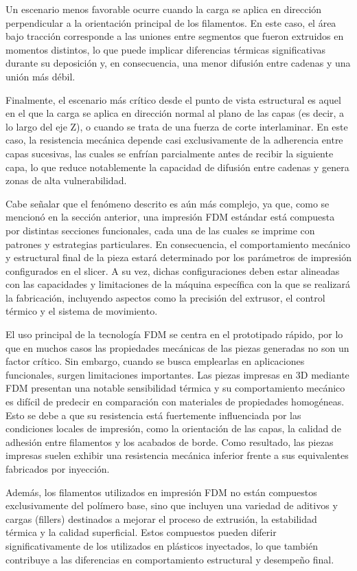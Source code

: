 Un escenario menos favorable ocurre cuando la carga se aplica en dirección perpendicular a la orientación principal de los filamentos. En este caso, el área bajo tracción corresponde a las uniones entre segmentos que fueron extruidos en momentos distintos, lo que puede implicar diferencias térmicas significativas durante su deposición y, en consecuencia, una menor difusión entre cadenas y una unión más débil.

Finalmente, el escenario más crítico desde el punto de vista estructural es aquel en el que la carga se aplica en dirección normal al plano de las capas (es decir, a lo largo del eje Z), o cuando se trata de una fuerza de corte interlaminar. En este caso, la resistencia mecánica depende casi exclusivamente de la adherencia entre capas sucesivas, las cuales se enfrían parcialmente antes de recibir la siguiente capa, lo que reduce notablemente la capacidad de difusión entre cadenas y genera zonas de alta vulnerabilidad.

Cabe señalar que el fenómeno descrito es aún más complejo, ya que, como se mencionó en la sección anterior, una impresión FDM estándar está compuesta por distintas secciones funcionales, cada una de las cuales se imprime con patrones y estrategias particulares. En consecuencia, el comportamiento mecánico y estructural final de la pieza estará determinado por los parámetros de impresión configurados en el slicer. A su vez, dichas configuraciones deben estar alineadas con las capacidades y limitaciones de la máquina específica con la que se realizará la fabricación, incluyendo aspectos como la precisión del extrusor, el control térmico y el sistema de movimiento.

El uso principal de la tecnología FDM se centra en el prototipado rápido, por lo que en muchos casos las propiedades mecánicas de las piezas generadas no son un factor crítico. Sin embargo, cuando se busca emplearlas en aplicaciones funcionales, surgen limitaciones importantes. Las piezas impresas en 3D mediante FDM presentan una notable sensibilidad térmica y su comportamiento mecánico es difícil de predecir en comparación con materiales de propiedades homogéneas. Esto se debe a que su resistencia está fuertemente influenciada por las condiciones locales de impresión, como la orientación de las capas, la calidad de adhesión entre filamentos y los acabados de borde. Como resultado, las piezas impresas suelen exhibir una resistencia mecánica inferior frente a sus equivalentes fabricados por inyección.

Además, los filamentos utilizados en impresión FDM no están compuestos exclusivamente del polímero base, sino que incluyen una variedad de aditivos y cargas (fillers) destinados a mejorar el proceso de extrusión, la estabilidad térmica y la calidad superficial. Estos compuestos pueden diferir significativamente de los utilizados en plásticos inyectados, lo que también contribuye a las diferencias en comportamiento estructural y desempeño final.

